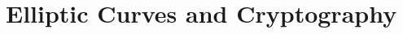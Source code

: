 \documentclass[12pt, oneside]{book}
\renewcommand{\theenumi}{\arabic{enumi}}
\renewcommand{\labelenumi}{\theenumi.}
\begin{document}
\chapter{Elliptic Curves and Cryptography}\label{elliptic curves}
\vspace*{-0.25in}



\renewcommand{\theenumi}{\alph{enumi}}
\renewcommand{\labelenumi}{(\theenumi)}


% 



% 


% 



% 

% 
\end{document}
